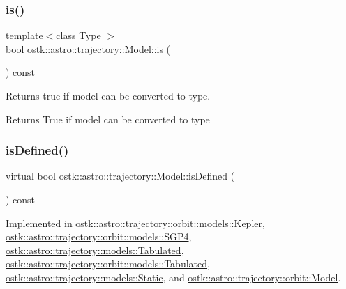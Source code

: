\mbox{\label{classostk_1_1astro_1_1trajectory_1_1_model_aedde1c01efbf407cca64b3f18b1a60f2}} 
\subsubsection{\texorpdfstring{is()}{is()}}
{\footnotesize\ttfamily template$<$class Type $>$ \\
bool ostk\+::astro\+::trajectory\+::\+Model\+::is (\begin{DoxyParamCaption}{ }\end{DoxyParamCaption}) const\hspace{0.3cm}{\ttfamily [inline]}}



Returns true if model can be converted to type. 

\begin{DoxyReturn}{Returns}
True if model can be converted to type 
\end{DoxyReturn}
\mbox{\label{classostk_1_1astro_1_1trajectory_1_1_model_a0d5cf6f754905f06c0ec1e39618c20a1}} 
\subsubsection{\texorpdfstring{is\+Defined()}{isDefined()}}
{\footnotesize\ttfamily virtual bool ostk\+::astro\+::trajectory\+::\+Model\+::is\+Defined (\begin{DoxyParamCaption}{ }\end{DoxyParamCaption}) const\hspace{0.3cm}{\ttfamily [pure virtual]}}



Implemented in \hyperlink{classostk_1_1astro_1_1trajectory_1_1orbit_1_1models_1_1_kepler_a4c74402d5483a51e5e0fe1920cd52ec4}{ostk\+::astro\+::trajectory\+::orbit\+::models\+::\+Kepler}, \hyperlink{classostk_1_1astro_1_1trajectory_1_1orbit_1_1models_1_1_s_g_p4_ab18e0666588bd517c190942b1a54ed18}{ostk\+::astro\+::trajectory\+::orbit\+::models\+::\+S\+G\+P4}, \hyperlink{classostk_1_1astro_1_1trajectory_1_1models_1_1_tabulated_a379da4c10a738c3f4578042c9bae0c91}{ostk\+::astro\+::trajectory\+::models\+::\+Tabulated}, \hyperlink{classostk_1_1astro_1_1trajectory_1_1orbit_1_1models_1_1_tabulated_ad114ba4762b54211f74f0aa3ac5eedae}{ostk\+::astro\+::trajectory\+::orbit\+::models\+::\+Tabulated}, \hyperlink{classostk_1_1astro_1_1trajectory_1_1models_1_1_static_a5a80d75c9215af9b198c9f8653c5bc17}{ostk\+::astro\+::trajectory\+::models\+::\+Static}, and \hyperlink{classostk_1_1astro_1_1trajectory_1_1orbit_1_1_model_a13c5b5693dd86a072da0bd0e319bacc2}{ostk\+::astro\+::trajectory\+::orbit\+::\+Model}.

